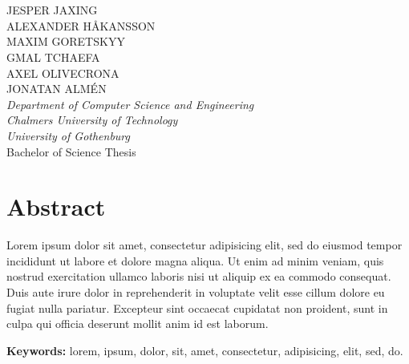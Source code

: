 \large
\textbf{\varthetitle}\\
\varthesubtitle\\[0.7cm]
JESPER JAXING\\
ALEXANDER HÅKANSSON\\
MAXIM GORETSKYY\\
GMAL TCHAEFA\\
AXEL OLIVECRONA\\
JONATAN ALMÉN\\
\normalsize
\textit{Department of Computer Science and Engineering\\
Chalmers University of Technology\\
University of Gothenburg}\\[0.7cm]
Bachelor of Science Thesis
\setlength{\parskip}{0.5cm}

\thispagestyle{plain}			%
\setlength{\parskip}{0pt plus 1.0pt}
\section*{Abstract}
Lorem ipsum dolor sit amet, consectetur adipisicing elit, sed do eiusmod tempor incididunt ut labore et dolore magna aliqua. Ut enim ad minim veniam, quis nostrud exercitation ullamco laboris nisi ut aliquip ex ea commodo consequat. Duis aute irure dolor in reprehenderit in voluptate velit esse cillum dolore eu fugiat nulla pariatur. Excepteur sint occaecat cupidatat non proident, sunt in culpa qui officia deserunt mollit anim id est laborum.

\vfill
\textbf{Keywords:} lorem, ipsum, dolor, sit, amet, consectetur, adipisicing, elit, sed, do.

\newpage				%
\thispagestyle{empty}
\mbox{}